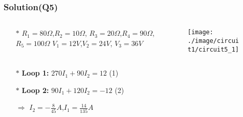 \documentclass{beamer}
\begin{document}
\begin{frame}
\frametitle{Solution(Q5)}
\begin{columns}
\begin{column}{5cm}
\begin{itemize} \itemsep1pt \parskip0pt 
  \item[$\ast$]  $R_1 = 80\Omega$,$R_2 = 10\Omega$,\newline
  $R_3 = 20\Omega$,$R_4 = 90\Omega$,\newline
  $R_5 = 100\Omega$ \newline
  $V_1 = 12V$,$V_2 = 24V$,\newline
  $V_3 = 36V$
\end{itemize}
\end{column}



\begin{column}{8cm}
\begin{figure}[H]
  \centering
  \texttt{[image: ./image/circuit1/circuit5\_1]}
\end{figure}
\end{column}
\end{columns}

\begin{itemize} \itemsep1pt \parskip0pt 
  \item[$\ast$] {\bf Loop 1:} $270I_1 + 90I_2 = 12$ \hspace{8 mm}(1)
  \item[$\ast$] {\bf Loop 2:} $90I_1 + 120I_2 = -12$ \hspace{8 mm}(2)
  \item[$\Rightarrow$] $I_2 = -\frac{8}{45}A$,$I_1 = \frac{14}{135}A$
\end{itemize}

\end{frame}

\end{document}
